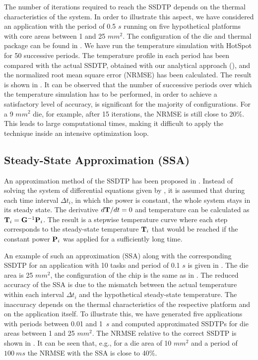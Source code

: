 The number of iterations required to reach the SSDTP depends on the thermal characteristics of the system. In order to illustrate this aspect, we have considered an application with the period of 0.5 $s$ running on five hypothetical platforms with core areas between 1 and 25 $mm^2$. The configuration of the die and thermal package can be found in . We have run the temperature simulation with HotSpot \cite{huang2003} for 50 successive periods. The temperature profile in each period has been compared with the actual SSDTP, obtained with our analytical approach (), and the normalized root mean square error (NRMSE) has been calculated. The result is shown in . It can be observed that the number of successive periods over which the temperature simulation has to be performed, in order to achieve a satisfactory level of accuracy, is significant for the majority of configurations. For a 9 $mm^2$ die, for example, after 15 iterations, the NRMSE is still close to 20\%. This leads to large computational times, making it difficult to apply the technique inside an intensive optimization loop.

\subsection{Steady-State Approximation (SSA)} \label{sec:steady-state-approximation}
An approximation method of the SSDTP has been proposed in \cite{huang2009}. Instead of solving the system of differential equations given by , it is assumed that during each time interval $\Delta t_i$, in which the power is constant, the whole system stays in its steady state. The derivative $d\mathbf{T}/dt = 0$ and temperature can be calculated as $\mathbf{T}_i = \mathbf{G}^{-1} \mathbf{P}_i$. The result is a stepwise temperature curve where each step corresponds to the steady-state temperature $\mathbf{T}_i$ that would be reached if the constant power $\mathbf{P}_i$ was applied for a sufficiently long time.

An example of such an approximation (SSA) along with the corresponding SSDTP for an application with 10 tasks and period of 0.1 $s$ is given in . The die area is 25 $mm^2$, the configuration of the chip is the same as in . The reduced accuracy of the SSA is due to the mismatch between the actual temperature within each interval $\Delta t_i$ and the hypothetical steady-state temperature. The inaccuracy depends on the thermal characteristics of the respective platform and on the application itself. To illustrate this, we have generated five applications with periods between 0.01 and 1~$s$ and computed approximated SSDTPs for die areas between 1 and 25 $mm^2$. The NRMSE relative to the correct SSDTP is shown in . It can be seen that, e.g., for a die area of 10 $mm^2$ and a period of $100~ms$ the NRMSE with the SSA is close to 40\%.
